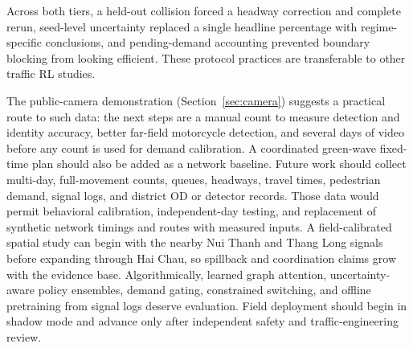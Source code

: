 \documentclass[12pt,a4paper]{report}
\begin{document}
Across both tiers, a held-out collision forced a headway correction and complete rerun, seed-level uncertainty replaced a single headline percentage with regime-specific conclusions, and pending-demand accounting prevented boundary blocking from looking efficient. These protocol practices are transferable to other traffic RL studies.

The public-camera demonstration (Section~\ref{sec:camera}) suggests a practical route to such data: the next steps are a manual count to measure detection and identity accuracy, better far-field motorcycle detection, and several days of video before any count is used for demand calibration. A coordinated green-wave fixed-time plan should also be added as a network baseline. Future work should collect multi-day, full-movement counts, queues, headways, travel times, pedestrian demand, signal logs, and district OD or detector records. Those data would permit behavioral calibration, independent-day testing, and replacement of synthetic network timings and routes with measured inputs. A field-calibrated spatial study can begin with the nearby Nui Thanh and Thang Long signals before expanding through Hai Chau, so spillback and coordination claims grow with the evidence base. Algorithmically, learned graph attention, uncertainty-aware policy ensembles, demand gating, constrained switching, and offline pretraining from signal logs deserve evaluation. Field deployment should begin in shadow mode and advance only after independent safety and traffic-engineering review.

\appendix
\end{document}
